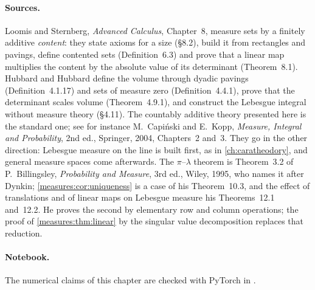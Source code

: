 \begin{notechapter}
\paragraph{Sources.} Loomis and Sternberg, \emph{Advanced Calculus},
Chapter~8, measure sets by a finitely additive \emph{content}: they
state axioms for a size (\S8.2), build it from rectangles and pavings,
define contented sets (Definition~6.3) and prove that a linear map
multiplies the content by the absolute value of its determinant
(Theorem~8.1). Hubbard and Hubbard define the volume through dyadic
pavings (Definition~4.1.17) and sets of measure zero (Definition~4.4.1),
prove that the determinant scales volume (Theorem~4.9.1), and construct
the Lebesgue integral without measure theory (\S4.11). The countably
additive theory presented here is the standard one; see for instance
M.~Capi\'nski and E.~Kopp, \emph{Measure, Integral and Probability},
2nd ed., Springer, 2004, Chapters~2 and~3. They go in the other
direction: Lebesgue measure on the line is built first, as in
\cref{ch:caratheodory}, and general measure spaces come afterwards.
The $\pi$--$\lambda$ theorem is Theorem~3.2 of P.~Billingsley,
\emph{Probability and Measure}, 3rd ed., Wiley, 1995, who names it
after Dynkin; \cref{measures:cor:uniqueness} is a case of his
Theorem~10.3, and the effect of translations and of linear maps on
Lebesgue measure his Theorems~12.1 and~12.2. He proves the second by
elementary row and column operations; the proof of
\cref{measures:thm:linear} by the singular value decomposition
replaces that reduction.

\paragraph{Notebook.} The numerical claims of this chapter are checked
with PyTorch in .


\end{notechapter}

